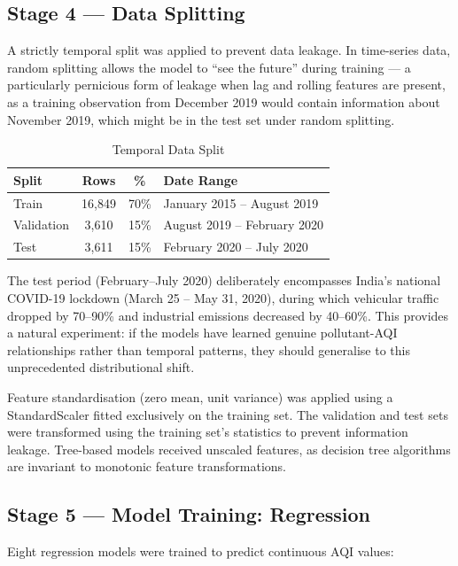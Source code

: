 \documentclass[12pt,a4paper]{report}
\begin{document}
\subsection{Stage 4 --- Data Splitting}

A strictly temporal split was applied to prevent data leakage. In time-series data, random splitting allows the model to ``see the future'' during training --- a particularly pernicious form of leakage when lag and rolling features are present, as a training observation from December 2019 would contain information about November 2019, which might be in the test set under random splitting.

\begin{table}[H]
\centering
\caption{Temporal Data Split}
\label{tab:split}
\begin{tabular}{|l|c|c|l|}
\hline
\textbf{Split} & \textbf{Rows} & \textbf{\%} & \textbf{Date Range} \\
\hline
Train & 16,849 & 70\% & January 2015 -- August 2019 \\
\hline
Validation & 3,610 & 15\% & August 2019 -- February 2020 \\
\hline
Test & 3,611 & 15\% & February 2020 -- July 2020 \\
\hline
\end{tabular}
\end{table}

The test period (February--July 2020) deliberately encompasses India's national COVID-19 lockdown (March 25 -- May 31, 2020), during which vehicular traffic dropped by 70--90\% and industrial emissions decreased by 40--60\%. This provides a natural experiment: if the models have learned genuine pollutant-AQI relationships rather than temporal patterns, they should generalise to this unprecedented distributional shift.

Feature standardisation (zero mean, unit variance) was applied using a StandardScaler fitted exclusively on the training set. The validation and test sets were transformed using the training set's statistics to prevent information leakage. Tree-based models received unscaled features, as decision tree algorithms are invariant to monotonic feature transformations.

\subsection{Stage 5 --- Model Training: Regression}

Eight regression models were trained to predict continuous AQI values:
\end{document}
